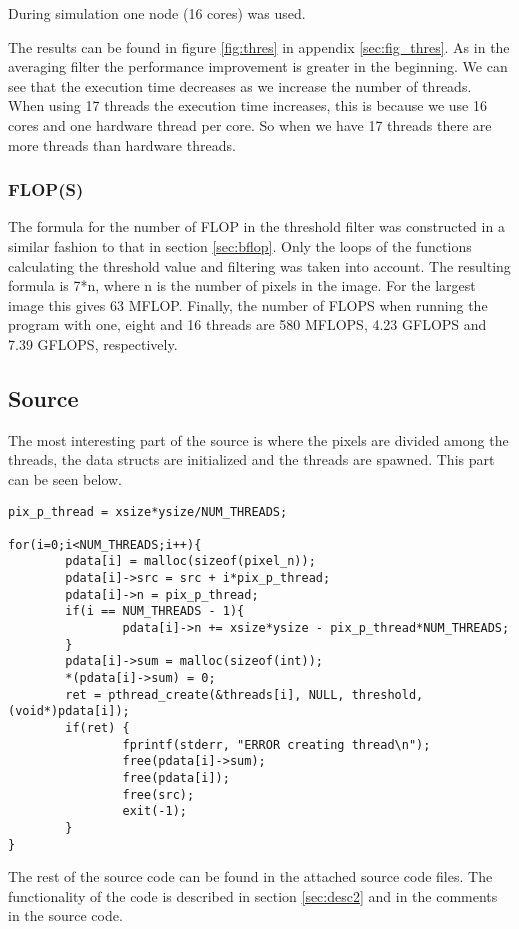 \documentclass[a4paper, 12pt]{article}
\begin{document}
During simulation one node (16 cores) was used.

The results can be found in figure \ref{fig:thres} in appendix
\ref{sec:fig_thres}. As in the averaging filter the performance improvement is
greater in the beginning. We can see that the execution time decreases as we
increase the number of threads. When using 17 threads the execution time
increases, this is because we use 16 cores and one hardware thread per core. So
when we have 17 threads there are more threads than hardware threads. 

\subsubsection{FLOP(S)}
The formula for the number of FLOP in the threshold filter was constructed in a
similar fashion to that in section \ref{sec:bflop}. Only the loops of the
functions calculating the threshold value and filtering was taken into account. 
The resulting formula is 7*n, where n is the number of pixels in the image. For
the largest image this gives 63 MFLOP. Finally, the number of FLOPS when running
the program with one, eight and 16 threads are 580 MFLOPS, 4.23 GFLOPS and 7.39
GFLOPS, respectively. 

\subsection{Source}

The most interesting part of the source is where the pixels are divided among
the threads, the data structs are initialized and the threads are spawned. 
This part can be seen below.
\begin{lstlisting}
pix_p_thread = xsize*ysize/NUM_THREADS;

for(i=0;i<NUM_THREADS;i++){
        pdata[i] = malloc(sizeof(pixel_n));
        pdata[i]->src = src + i*pix_p_thread;
        pdata[i]->n = pix_p_thread;
        if(i == NUM_THREADS - 1){
                pdata[i]->n += xsize*ysize - pix_p_thread*NUM_THREADS;
        }
        pdata[i]->sum = malloc(sizeof(int));
        *(pdata[i]->sum) = 0;
        ret = pthread_create(&threads[i], NULL, threshold, (void*)pdata[i]);
        if(ret) {
                fprintf(stderr, "ERROR creating thread\n");
                free(pdata[i]->sum);
                free(pdata[i]);
                free(src);
                exit(-1);
        }
}
\end{lstlisting}

The rest of the source code can be found in the attached source code files.
The functionality of the code is described in section \ref{sec:desc2} and in the
comments in the source code.
\end{document}
